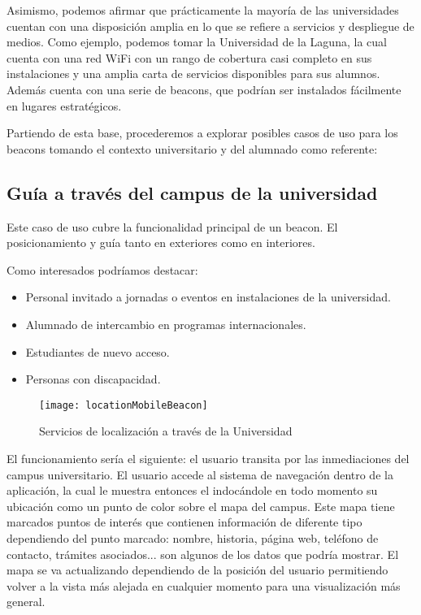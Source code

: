 Asimismo, podemos afirmar que prácticamente la mayoría de las universidades cuentan con una disposición amplia en lo que se refiere a servicios y despliegue de medios. Como ejemplo, podemos tomar la Universidad de la Laguna, la cual cuenta con una red WiFi con un rango de cobertura casi completo en sus instalaciones y una amplia carta de servicios disponibles para sus alumnos. Además cuenta con una serie de beacons, que podrían ser instalados fácilmente en lugares estratégicos. 

Partiendo de esta base, procederemos a explorar posibles casos de uso para los beacons tomando el contexto universitario y del alumnado como referente:

\subsection{Guía a través del campus de la universidad}

Este caso de uso cubre la funcionalidad principal de un beacon. El posicionamiento y guía tanto en exteriores como en interiores. 

Como interesados podríamos destacar: 

\begin{itemize}
\item Personal invitado a jornadas o eventos en instalaciones de la universidad.
\item Alumnado de intercambio en programas internacionales.
\item Estudiantes de nuevo acceso.
\item Personas con discapacidad.
\end{itemize}

\begin{figure}[h]
	\centering
	\texttt{[image: locationMobileBeacon]}
	\caption{Servicios de localización a través de la Universidad}
	\label{fig:beaconLocation}
\end{figure}

El funcionamiento sería el siguiente: el usuario transita por las inmediaciones del campus universitario. El usuario accede al sistema de navegación dentro de la aplicación, la cual le muestra entonces el indocándole  en todo momento su ubicación como un punto de color sobre el mapa del campus. Este mapa tiene marcados puntos de interés que contienen información de diferente tipo dependiendo del punto marcado: nombre, historia, página web, teléfono de contacto, trámites asociados... son algunos de los datos que podría mostrar. El mapa se va actualizando dependiendo de la posición del usuario permitiendo volver a la vista más alejada en cualquier momento para una visualización más general.


